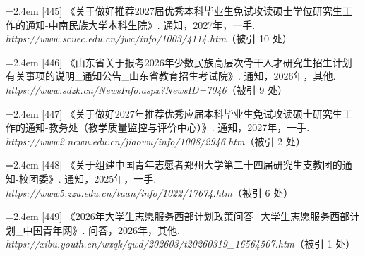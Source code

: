 {\vspace{0.6pt}
\vspace{3.5pt}\par
\nopagebreak\vspace{1pt}
\noindent\hangindent=2.4em \label{src:S0594}{\color{cAccent}[445]} 《关于做好推荐2027届优秀本科毕业生免试攻读硕士学位研究生工作的通知-中南民族大学本科生院》. 通知，2027年，一手. \textit{https://www.scuec.edu.cn/jwc/info/1003/4114.htm}（被引 10 处）\par
\vspace{0.6pt}
\vspace{3.5pt}\par
\nopagebreak\vspace{1pt}
\noindent\hangindent=2.4em \label{src:S0595}{\color{cAccent}[446]} 《山东省关于报考2026年少数民族高层次骨干人才研究生招生计划有关事项的说明\_通知公告\_山东省教育招生考试院》. 通知，2026年，其他. \textit{https://www.sdzk.cn/NewsInfo.aspx?NewsID=7046}（被引 9 处）\par
\vspace{0.6pt}
\vspace{3.5pt}\par
\nopagebreak\vspace{1pt}
\noindent\hangindent=2.4em \label{src:S0596}{\color{cAccent}[447]} 《关于做好2027年推荐优秀应届本科毕业生免试攻读硕士研究生工作的通知-教务处（教学质量监控与评价中心）》. 通知，2027年，一手. \textit{https://www2.ncwu.edu.cn/jiaowu/info/1008/2946.htm}（被引 2 处）\par
\vspace{0.6pt}
\vspace{3.5pt}\par
\nopagebreak\vspace{1pt}
\noindent\hangindent=2.4em \label{src:S0597}{\color{cAccent}[448]} 《关于组建中国青年志愿者郑州大学第二十四届研究生支教团的通知-校团委》. 通知，2025年，一手. \textit{https://www5.zzu.edu.cn/tuan/info/1022/17674.htm}（被引 6 处）\par
\vspace{0.6pt}
\vspace{3.5pt}\par
\nopagebreak\vspace{1pt}
\noindent\hangindent=2.4em \label{src:S0598}{\color{cAccent}[449]} 《2026年大学生志愿服务西部计划政策问答\_大学生志愿服务西部计划\_中国青年网》. 问答，2026年，其他. \textit{https://xibu.youth.cn/wxqk/qwd/202603/t20260319\_16564507.htm}（被引 1 处）\par
}
